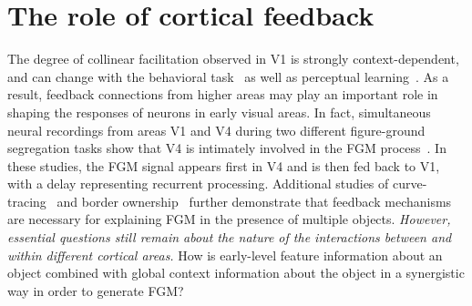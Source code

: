 \section{The role of cortical feedback}
The degree of collinear facilitation observed in V1 is strongly context-dependent, and can change with the behavioral task~\citep{Li_etal04, Li_etal06} as well as perceptual learning~\citep{Li_etal08a, Yan_etal14}. As a result, feedback connections from higher areas may play an important role in shaping the responses of neurons in early visual areas. In fact, simultaneous neural recordings from areas V1 and V4 during two different figure-ground segregation tasks show that V4 is intimately involved in the FGM process~\citep{Poort_etal12, Chen_etal14}. In these studies, the FGM signal appears first in V4 and is then fed back to V1, with a delay representing recurrent processing. Additional studies of curve-tracing~\citep{Roelfsema_etal98} and border ownership~\citep{Zhou_etal00, Qiu_etal07, Zhang_vonderHeydt10} further
demonstrate that feedback mechanisms are necessary for explaining FGM
in the presence of multiple objects. \textit{However, essential  questions still remain about the nature of the interactions between  and within different cortical areas.} How is early-level feature information about an object combined with global context information about the object in a synergistic way in order to generate FGM?

